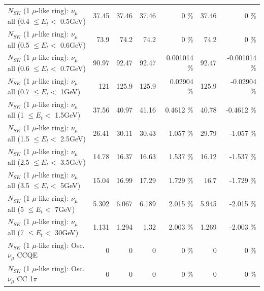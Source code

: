\begin{table}
\begin{tabular}{| l | r | r | r  r | r  r |}
       $N_{SK}$ (1 $\mu$-like ring): $\nu_{\mu}$ all (0.4 $\leq E_{t} <$ 0.5GeV) &           37.45 &           37.46 &           37.46 &        0 \%  &           37.46 &        0 \%  \\ 
       $N_{SK}$ (1 $\mu$-like ring): $\nu_{\mu}$ all (0.5 $\leq E_{t} <$ 0.6GeV) &            73.9 &            74.2 &            74.2 &        0 \%  &            74.2 &        0 \%  \\ 
       $N_{SK}$ (1 $\mu$-like ring): $\nu_{\mu}$ all (0.6 $\leq E_{t} <$ 0.7GeV) &           90.97 &           92.47 &           92.47 & 0.001014 \%  &           92.47 & -0.001014 \%  \\ 
         $N_{SK}$ (1 $\mu$-like ring): $\nu_{\mu}$ all (0.7 $\leq E_{t} <$ 1GeV) &             121 &           125.9 &           125.9 &  0.02904 \%  &           125.9 & -0.02904 \%  \\ 
         $N_{SK}$ (1 $\mu$-like ring): $\nu_{\mu}$ all (1 $\leq E_{t} <$ 1.5GeV) &           37.56 &           40.97 &           41.16 &   0.4612 \%  &           40.78 &  -0.4612 \%  \\ 
       $N_{SK}$ (1 $\mu$-like ring): $\nu_{\mu}$ all (1.5 $\leq E_{t} <$ 2.5GeV) &           26.41 &           30.11 &           30.43 &    1.057 \%  &           29.79 &   -1.057 \%  \\ 
       $N_{SK}$ (1 $\mu$-like ring): $\nu_{\mu}$ all (2.5 $\leq E_{t} <$ 3.5GeV) &           14.78 &           16.37 &           16.63 &    1.537 \%  &           16.12 &   -1.537 \%  \\ 
         $N_{SK}$ (1 $\mu$-like ring): $\nu_{\mu}$ all (3.5 $\leq E_{t} <$ 5GeV) &           15.04 &           16.99 &           17.29 &    1.729 \%  &            16.7 &   -1.729 \%  \\ 
           $N_{SK}$ (1 $\mu$-like ring): $\nu_{\mu}$ all (5 $\leq E_{t} <$ 7GeV) &           5.302 &           6.067 &           6.189 &    2.015 \%  &           5.945 &   -2.015 \%  \\ 
          $N_{SK}$ (1 $\mu$-like ring): $\nu_{\mu}$ all (7 $\leq E_{t} <$ 30GeV) &           1.131 &           1.294 &            1.32 &    2.003 \%  &           1.269 &   -2.003 \%  \\ 
\hline
\hline
                               $N_{SK}$ (1 $\mu$-like ring): Osc. $\nu_\mu$ CCQE &               0 &               0 &               0 &        0 \%  &               0 &        0 \%  \\ 
                          $N_{SK}$ (1 $\mu$-like ring): Osc. $\nu_\mu$ CC 1$\pi$ &               0 &               0 &               0 &        0 \%  &               0 &        0 \%  \\ 

\end{tabular}
\end{table}
